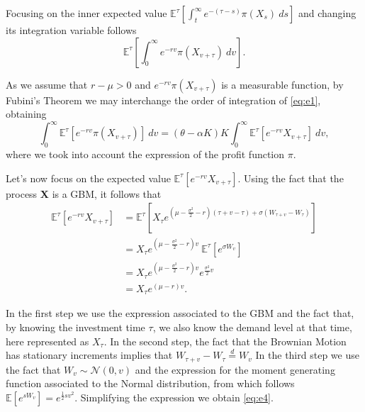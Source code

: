 Focusing on the inner expected value $\mathds{E}^{\tau}\left[  \int_t^\infty e^{-(\tau-s) }\pi(X_s) \ ds  \right]$ and changing its integration variable follows
\begin{equation}
\mathds{E}^{\tau}\left[  \int_0^\infty e^{-rv }\pi(X_{v+\tau})\ dv  \right].
\label{eq:e1}
\end{equation}

As we assume that $r-\mu>0$ and $e^{-rv }\pi(X_{v+\tau})$ is a measurable function, by Fubini's Theorem we may interchange the order of integration of \eqref{eq:e1}, obtaining
\begin{equation}
\int_0^\infty\mathds{E}^{\tau}\left[   e^{-rv }\pi(X_{v+\tau}) \right]\ dv
= (\theta-\alpha K)K \int_0^\infty\mathds{E}^{\tau}\left[   e^{-rv } X_{v+\tau} \right]\ dv,
\label{eq:e2}
\end{equation}
where we took into account the expression of the profit function $\pi$.


Let's now focus on the expected value $\mathds{E}^{\tau}\left[   e^{-rv }  X_{v+\tau} \right]$.
Using the fact that the process \textbf{X} is a GBM, it follows that
\begin{align}
\mathds{E}^{\tau}\left[   e^{-rv } X_{v+\tau} \right] 
&= \mathds{E}^{\tau}\left[   X_\tau e^{\left(\mu- \frac{\sigma^2}{2}-r \right) (\tau+v-\tau) + \sigma (W_{\tau+v}-W_\tau)}\right] \nonumber \\
&=X_\tau e^{\left(\mu- \frac{\sigma^2}{2}-r \right) v} \ \mathds{E}^{\tau}\left[ e^{\sigma W_v} \right] \nonumber \\
&=X_\tau e^{\left(\mu- \frac{\sigma^2}{2}-r \right) v} e^{ \frac{\sigma^2}{2} v} \nonumber \\
&=X_\tau e^{(\mu-r)v}.
\label{eq:e4}
\end{align}


In the first step we use the expression associated to the GBM and the fact that, by knowing the investment time $\tau$, we also know the demand level at that time, here represented as $X_\tau$. In the second step, the fact that the Brownian Motion has stationary increments implies that $W_{\tau+v}-W_\tau \overset{d}{=}  W_v$
In the third step we use the fact that $ W_v \sim \mathcal{N}(0,v)$ and the expression for the moment generating function associated to the Normal distribution, from which follows $\mathds{E}\left[e^{sW_v}\right]=e^{\frac{1}{2} s v^2}$. Simplifying the expression we obtain \eqref{eq:e4}.

